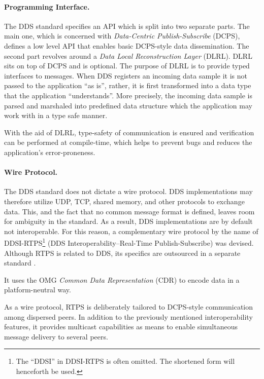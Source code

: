 \paragraph{Programming Interface.}
The DDS standard specifies an API which is split into two separate parts. The main one, which is concerned with \emph{Data-Centric Publish-Subscribe} (DCPS), defines a low level API that enables basic DCPS-style data dissemination. The second part revolves around a \emph{Data Local Reconstruction Layer} (DLRL). DLRL sits on top of DCPS and is optional. 
The purpose of DLRL is to provide typed interfaces to messages. When DDS registers an incoming data sample it is not passed to the application ``as is'', rather, it is first transformed into a data type that the application ``understands''. More precisely, the incoming data sample is parsed and marshaled into predefined data structure which the application may work with in a type safe manner.



With the aid of DLRL, type-safety of communication is ensured and verification can be performed at compile-time, which helps to prevent bugs and reduces the application's error-proneness. 


\paragraph{Wire Protocol.}
The DDS standard does not dictate a wire protocol. DDS implementations may therefore utilize UDP, TCP, shared memory, and other protocols to exchange data. This, and the fact that no common message format is defined, leaves room for ambiguity in the standard. As a result, DDS implementations are by default not interoperable. For this reason, a complementary wire protocol by the name of DDSI-RTPS\footnote{The ``DDSI'' in DDSI-RTPS is often omitted. The shortened form will henceforth be used.} (DDS Interoperability--Real-Time Publish-Subscribe) was devised. Although RTPS is related to DDS, its specifics are outsourced in a separate standard \cite{rtps-2.2-standard}.



It uses the OMG \emph{Common Data Representation} (CDR) to encode data in a platform-neutral way. 

As a wire protocol, RTPS is deliberately tailored to DCPS-style communication among dispersed peers. In addition to the previously mentioned interoperability features, it provides multicast capabilities as means to enable simultaneous message delivery to several peers.

